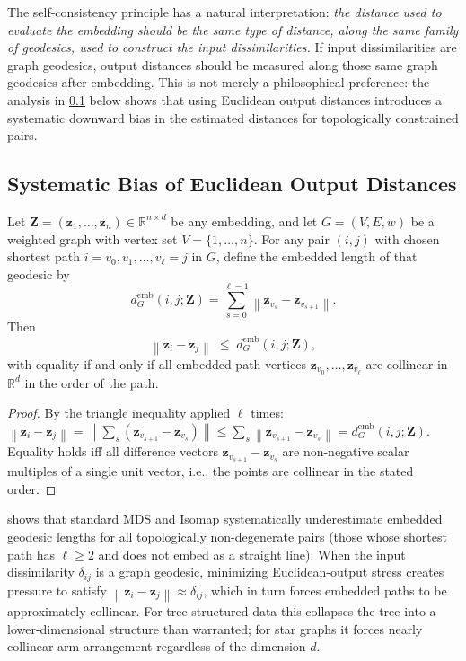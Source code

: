 \documentclass[twoside,11pt]{article}
\newcommand{\R}{\mathbb{R}}
\newcommand{\bz}{\mathbf{z}}
\newcommand{\bZ}{\mathbf{Z}}
\newcommand{\norm}[1]{\left\|#1\right\|}
\newcommand{\demb}{d^{\mathrm{emb}}}
\begin{document}
The self-consistency principle has a natural interpretation:
\emph{the distance used to evaluate the embedding should be the same
type of distance, along the same family of geodesics, used to construct
the input dissimilarities.}
If input dissimilarities are graph geodesics, output distances should be
measured along those same graph geodesics after embedding.  This is not
merely a philosophical preference: the
analysis in \cref{sec:systematic_bias} below shows that using Euclidean
output distances introduces a systematic downward bias in the estimated
distances for topologically constrained pairs.

\subsection{Systematic Bias of Euclidean Output Distances}
\label{sec:systematic_bias}

\begin{proposition}
  \label{prop:bias}
  Let $\bZ = (\bz_1, \ldots, \bz_n) \in \R^{n \times d}$ be any embedding,
  and let $G = (V, E, w)$ be a weighted graph with vertex set $V = \{1,
  \ldots, n\}$.  For any pair $(i,j)$ with chosen shortest path
  $i = v_0, v_1, \ldots, v_\ell = j$ in $G$, define the embedded length of
  that geodesic by
  \begin{equation}
    \demb_G(i,j;\bZ)
    = \sum_{s=0}^{\ell-1} \norm{\bz_{v_s} - \bz_{v_{s+1}}}.
    \label{eq:emb_geo}
  \end{equation}
  Then
  \begin{equation}
    \norm{\bz_i - \bz_j} \;\leq\; \demb_G(i,j;\bZ),
    \label{eq:triangle_bias}
  \end{equation}
  with equality if and only if all embedded path vertices
  $\bz_{v_0}, \ldots, \bz_{v_\ell}$ are collinear in $\R^d$ in the order
  of the path.
\end{proposition}

\begin{proof}
  By the triangle inequality applied $\ell$ times:
  $\norm{\bz_i - \bz_j} = \norm{\sum_{s} (\bz_{v_{s+1}} - \bz_{v_s})}
  \leq \sum_s \norm{\bz_{v_{s+1}} - \bz_{v_s}} = \demb_G(i,j;\bZ)$.
  Equality holds iff all difference vectors $\bz_{v_{s+1}} - \bz_{v_s}$
  are non-negative scalar multiples of a single unit vector, i.e., the
  points are collinear in the stated order.
\end{proof}

 shows that standard MDS and Isomap systematically
underestimate embedded geodesic lengths for all topologically
non-degenerate pairs (those whose shortest path has $\ell \geq 2$ and
does not embed as a straight line).  When the input dissimilarity
$\delta_{ij}$ is a graph geodesic, minimizing Euclidean-output stress
creates pressure to satisfy $\norm{\bz_i - \bz_j} \approx \delta_{ij}$,
which in turn forces embedded paths to be approximately collinear.
For tree-structured data this collapses the tree into a lower-dimensional
structure than warranted; for star graphs it forces nearly collinear arm
arrangement regardless of the dimension $d$.
\end{document}
